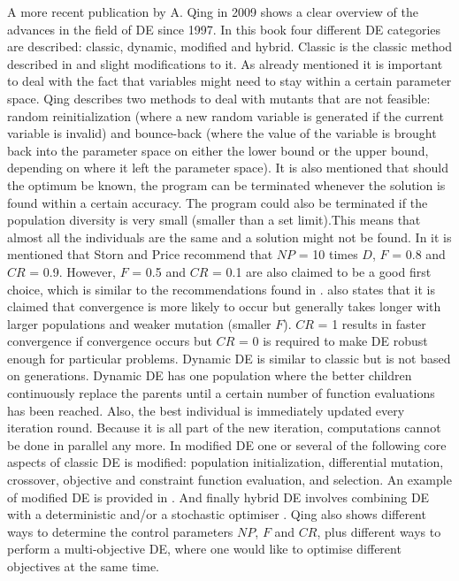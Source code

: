 A more recent publication by A. Qing in 2009 \cite{qing2009differential} shows a clear overview of the advances in the field of \ac{DE} since 1997. In this book four different \ac{DE} categories are described: classic, dynamic, modified and hybrid. Classic is the classic method described in  and slight modifications to it. As already mentioned it is important to deal with the fact that variables might need to stay within a certain parameter space. Qing describes two methods to deal with mutants that are not feasible: random reinitialization (where a new random variable is generated if the current variable is invalid) and bounce-back (where the value of the variable is brought back into the parameter space on either the lower bound or the upper bound, depending on where it left the parameter space). It is also mentioned that should the optimum be known, the program can be terminated whenever the solution is found within a certain accuracy. The program could also be terminated if the population diversity is very small (smaller than a set limit).This means that almost all the individuals are the same and a solution might not be found. In \cite{qing2009differential} it is mentioned that Storn and Price recommend that $NP$ = 10 times $D$, $F$ = 0.8 and $CR$ = 0.9. However, $F$ = 0.5 and $CR$ = 0.1 are also claimed to be a good first choice, which is similar to the recommendations found in \cite{storn1997differential}. \cite{qing2009differential} also states that it is claimed that convergence is more likely to occur but generally takes longer with larger populations and weaker mutation (smaller $F$). $CR$ = 1 results in faster convergence if convergence occurs but $CR$ = 0 is required to make DE robust enough for particular problems. Dynamic \ac{DE} is similar to classic but is not based on generations. Dynamic \ac{DE} has one population where the better children continuously replace the parents until a certain number of function evaluations has been reached. Also, the best individual is immediately updated every iteration round. Because it is all part of the new iteration, computations cannot be done in parallel any more. In modified \ac{DE} one or several of the following core aspects of classic \ac{DE} is modified: population initialization, differential mutation, crossover, objective and constraint function evaluation, and selection. An example of modified \ac{DE} is provided in \cite{feoktistov2006differential}. And finally hybrid \ac{DE} involves combining \ac{DE} with a deterministic and/or a stochastic optimiser \cite{qing2009differential}. Qing also shows different ways to determine the control parameters $NP$, $F$ and $CR$, plus different ways to perform a multi-objective \ac{DE}, where one would like to optimise different objectives at the same time.\\

